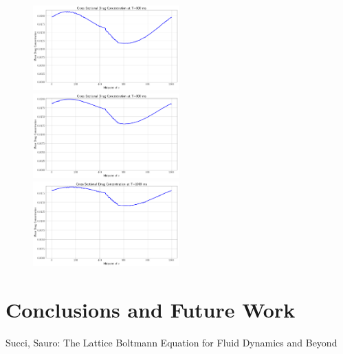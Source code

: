 \documentclass[11pt]{article} %
\begin{document}
\begin{figure}[h!]
\includegraphics[width=0.50\textwidth]{drug_profile/drug_profile_t_600.png}\\[0.25in]
\hspace*{-0.25in}
\includegraphics[width=0.50\textwidth]{drug_profile/drug_profile_t_800.png}
\includegraphics[width=0.50\textwidth]{drug_profile/drug_profile_t_1000.png}
\end{figure}

\newpage
\section{Conclusions and Future Work}


\begin{thebibliography}{9}
Succi, Sauro: The Lattice Boltmann Equation for Fluid Dynamics and Beyond

\end{thebibliography}
\end{document}
